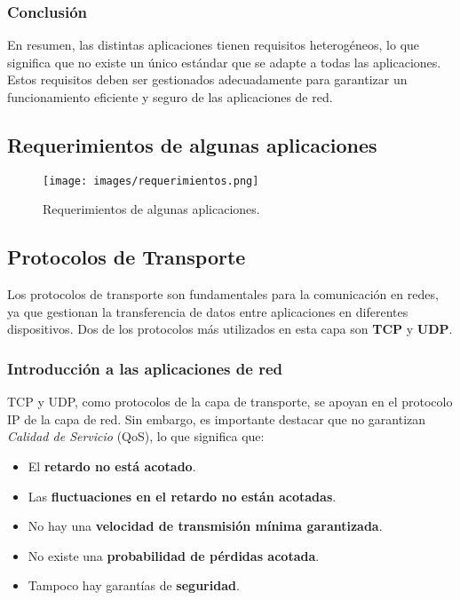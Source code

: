 \documentclass[a4paper,12pt]{article}
\begin{document}
\subsubsection{Conclusión}

En resumen, las distintas aplicaciones tienen requisitos heterogéneos, lo que significa que no existe un único estándar que se adapte a todas las aplicaciones. Estos requisitos deben ser gestionados adecuadamente para garantizar un funcionamiento eficiente y seguro de las aplicaciones de red.


\subsection{Requerimientos de algunas aplicaciones}

\begin{figure}[H]
    \centering
    \texttt{[image: images/requerimientos.png]}
    \caption{Requerimientos de algunas aplicaciones.}
    \label{fig:requerimientos-aplicaciones}
\end{figure}

\subsection{Protocolos de Transporte}

Los protocolos de transporte son fundamentales para la comunicación en redes, ya que gestionan la transferencia de datos entre aplicaciones en diferentes dispositivos. Dos de los protocolos más utilizados en esta capa son \textbf{TCP} y \textbf{UDP}.

\subsubsection{Introducción a las aplicaciones de red}

TCP y UDP, como protocolos de la capa de transporte, se apoyan en el protocolo IP de la capa de red. Sin embargo, es importante destacar que no garantizan \emph{Calidad de Servicio} (QoS), lo que significa que:

\begin{itemize}
    \item El \textbf{retardo no está acotado}.
    \item Las \textbf{fluctuaciones en el retardo no están acotadas}.
    \item No hay una \textbf{velocidad de transmisión mínima garantizada}.
    \item No existe una \textbf{probabilidad de pérdidas acotada}.
    \item Tampoco hay garantías de \textbf{seguridad}.
\end{itemize}
\end{document}
